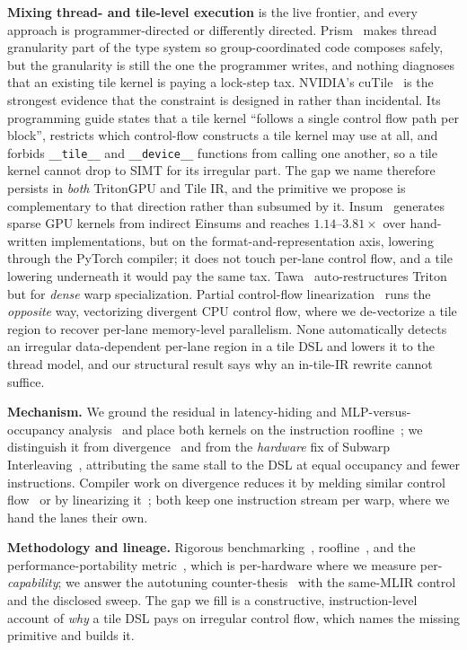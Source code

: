 \documentclass[sigplan,anonymous,review,nonacm,10pt]{acmart}
\begin{document}
\textbf{Mixing thread- and tile-level execution} is the live frontier, and every approach
is programmer-directed or differently directed. Prism~\cite{prism2026} makes thread
granularity part of the type system so group-coordinated code composes safely, but the
granularity is still the one the programmer writes, and nothing diagnoses that an existing
tile kernel is paying a lock-step tax. NVIDIA's cuTile~\cite{cutile2025} is the strongest
evidence that the constraint is designed in rather than incidental. Its programming guide
states that a tile kernel ``follows a single control flow path per block'', restricts which
control-flow constructs a tile kernel may use at all, and forbids \texttt{\_\_tile\_\_}
and \texttt{\_\_device\_\_} functions from calling one another, so a tile kernel cannot
drop to SIMT for its irregular part. The gap we name therefore persists in \emph{both}
TritonGPU and Tile IR, and the primitive we propose is complementary to that direction
rather than subsumed by it. Insum~\cite{insum2026} generates sparse GPU kernels from
indirect Einsums and reaches $1.14$--$3.81\times$ over hand-written implementations, but on
the format-and-representation axis, lowering through the PyTorch compiler; it does not touch
per-lane control flow, and a tile lowering underneath it would pay the same tax. Tawa~\cite{tawa2026} auto-restructures Triton but for \emph{dense} warp
specialization. Partial control-flow linearization~\cite{partialcfg2018} runs the
\emph{opposite} way, vectorizing divergent CPU control flow, where we de-vectorize a tile
region to recover per-lane memory-level parallelism. None automatically detects an
irregular data-dependent per-lane region in a tile DSL and lowers it to the thread model,
and our structural result says why an in-tile-IR rewrite cannot suffice.

\textbf{Mechanism.} We ground the residual in latency-hiding and MLP-versus-occupancy
analysis~\cite{volkov2016latency,hongkim2009} and place both kernels on the instruction
roofline~\cite{instroofline2022}; we distinguish it from divergence~\cite{fung2007} and
from the \emph{hardware} fix of Subwarp Interleaving~\cite{subwarp2022}, attributing the
same stall to the DSL at equal occupancy and fewer instructions. Compiler work on
divergence reduces it by melding similar control flow~\cite{darm2022} or by linearizing
it~\cite{partialcfg2018}; both keep one instruction stream per warp, where we hand the
lanes their own.

\textbf{Methodology and lineage.} Rigorous benchmarking~\cite{hoefler2015},
roofline~\cite{roofline2009}, and the performance-portability metric~\cite{pennycook2016},
which is per-hardware where we measure per-\emph{capability}; we answer the autotuning
counter-thesis~\cite{ringlein2025} with the same-MLIR control and the disclosed sweep. The
gap we fill is a constructive, instruction-level account of \emph{why} a tile DSL pays on
irregular control flow, which names the missing primitive and builds it.
\end{document}
